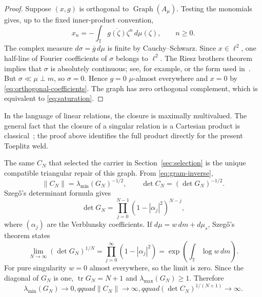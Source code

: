 \documentclass[11pt]{article}
\newcommand{\T}{\mathbb T}
\newcommand{\Graph}{\operatorname{Graph}}
\begin{document}
\begin{proof}
Suppose $(x,g)$ is orthogonal to $\Graph(A_\mu)$.  Testing the monomials gives, up to the fixed
inner-product convention,
\begin{equation}\label{eq:orthogonal-coefficients}
  x_n=-\int_{\T}\overline{g(\zeta)}\zeta^n\,d\mu(\zeta),
  \qquad n\geq0.
\end{equation}
The complex measure $d\sigma=\overline g\,d\mu$ is finite by Cauchy--Schwarz.  Since
$x\in\ell^2$, one half-line of Fourier coefficients of $\sigma$ belongs to $\ell^2$.
The Riesz brothers theorem implies that $\sigma$ is absolutely continuous; see, for example,
\cite[Chapter~4]{Duren1970} or the form used in~\cite[Theorem~2.6]{Yafaev2016}.  But
$\sigma\ll\mu\perp m$, so $\sigma=0$.  Hence $g=0$ $\mu$-almost everywhere and
$x=0$ by \eqref{eq:orthogonal-coefficients}.  The graph has zero orthogonal complement, which is
equivalent to \eqref{eq:saturation}.
\end{proof}

In the language of linear relations, the closure is maximally multivalued.  The general fact that
the closure of a singular relation is a Cartesian product is classical~\cite{HassiEtAl2007}; the
proof above identifies the full product directly for the present Toeplitz weld.

The same $C_N$ that selected the carrier in Section~\ref{sec:selection} is the unique compatible
triangular repair of this graph.  From \eqref{eq:gram-inverse},
\begin{equation}\label{eq:norm-law}
  \|C_N\|=\lambda_{\min}(G_N)^{-1/2},
  \qquad
  \det C_N=(\det G_N)^{-1/2}.
\end{equation}
Szeg\H{o}'s determinant formula gives
\begin{equation}\label{eq:szego-det}
  \det G_N=\prod_{j=0}^{N-1}(1-|\alpha_j|^2)^{N-j},
\end{equation}
where $(\alpha_j)$ are the Verblunsky coefficients.  If
$d\mu=w\,dm+d\mu_s$, Szeg\H{o}'s theorem states
\begin{equation}\label{eq:szego}
  \lim_{N\to\infty}(\det G_N)^{1/N}
  =\prod_{j=0}^{\infty}(1-|\alpha_j|^2)
  =\exp\left(\int_{\T}\log w\,dm\right).
\end{equation}
For pure singularity $w=0$ almost everywhere, so the limit is zero.  Since the diagonal of $G_N$
is one, $\operatorname{tr}G_N=N+1$ and $\lambda_{\max}(G_N)\geq1$.  Therefore
\begin{equation}\label{eq:divergence}
  \lambda_{\min}(G_N)\longrightarrow0,qquad
  \|C_N\|\longrightarrow\infty,qquad
  (\det C_N)^{1/(N+1)}\longrightarrow\infty.
\end{equation}
\end{document}
